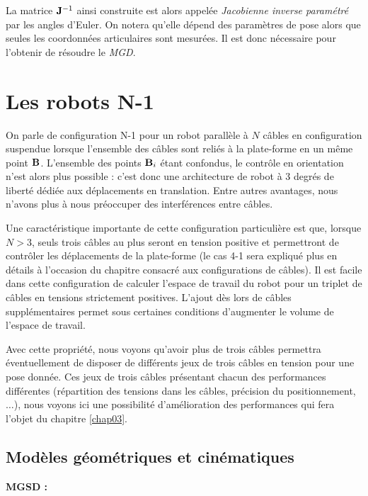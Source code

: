 La matrice ${\bf J}^{-1}$ ainsi construite est alors appelée {\it Jacobienne 
inverse param\'etr\'e} par les angles d'Euler. On notera qu'elle dépend des paramètres de pose alors que seules les coordonnées articulaires sont mesurées. Il est donc nécessaire pour l'obtenir de résoudre le {\it MGD}.

\section{Les robots N-1} \label{chap0-2}

On parle de configuration N-1 pour un robot parall\`ele \`a $N$ c\^ables en 
configuration suspendue lorsque l'ensemble des c\^ables sont reli\'es \`a la 
plate-forme en un m\^eme point ${\bf B}$. L'ensemble des points ${\bf B}_i$ étant confondus, le contr\^ole 
en orientation n'est alors plus possible : c'est donc une architecture de robot à 3 degrés de liberté d\'edi\'ee aux 
d\'eplacements en translation. Entre autres avantages, nous n'avons plus \`a 
nous pr\'eoccuper des interf\'erences entre c\^ables.

Une caractéristique importante de cette configuration particulière est que, lorsque $N > 3$, seuls trois c\^ables au plus seront en tension positive et 
permettront de contr\^oler les d\'eplacements de la plate-forme \cite{merlet2012} (le cas 4-1 sera expliqu\'e plus en d\'etails \`a l'occasion du chapitre consacr\'e aux configurations de c\^ables). Il est facile dans cette configuration de calculer l'espace de travail du robot pour un triplet de câbles en tensions strictement positives. L'ajout dès lors de câbles supplémentaires permet sous certaines conditions d'augmenter le volume de l'espace de travail.

Avec cette propriété, nous voyons qu'avoir plus de trois câbles permettra éventuellement de disposer de différents jeux de trois câbles en tension pour une pose donnée. Ces jeux de trois câbles présentant chacun des performances différentes (répartition des tensions dans les câbles, précision du positionnement, $\dots$), nous voyons ici une possibilité d'amélioration des performances qui fera l'objet du chapitre \ref{chap03}.

\subsection{Mod\`eles g\'eom\'etriques et cin\'ematiques}

{\bf MGSD :}\\

